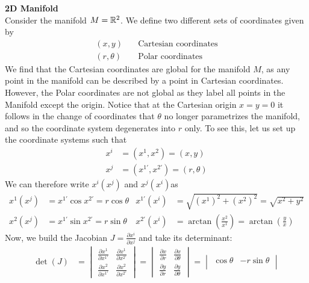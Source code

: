 \documentclass{article}
\begin{document}
 		\begin{exmp}
 			\textbf{2D Manifold}\\
 			Consider the manifold $M=\mathbb{R}^2$. We define two different sets of coordinates given by
 			\begin{align*}
 				(x,y) &\quad \text{Cartesian coordinates} \\
 				(r, \theta) &\quad \text{Polar coordinates}
 			\end{align*}
 			We find that the Cartesian coordinates are global for the manifold $M$, as any point in the manifold can be described by a point in Cartesian coordinates. However, the Polar coordinates are not global as they label all points in the Manifold except the origin. Notice that at the Cartesian origin $x=y=0$ it follows in the change of coordinates that $\theta$ no longer parametrizes the manifold, and so the coordinate system degenerates into $r$ only. To see this, let us set up the coordinate systems such that
 			\begin{align*}
 				x^i &= (x^1, x^2) = (x,y) \\
 				x^j &= (x^{1'}, x^{2'}) = (r, \theta)
 			\end{align*}
 			We can therefore write $x^i(x^j)$ and $x^j (x^i)$as
 			\begin{align*}
 				x^1(x^j) &= x^{1'} \cos x^{2'} = r\cos\theta  & x^{1'}(x^i) &= \sqrt{(x^1)^2 + (x^2)^2} = \sqrt{x^2 + y^2}\\
 				x^2 (x^j) &= x^{1'} \sin x^{2'} = r\sin \theta & x^{2'} (x^i) &= \arctan \left( \frac{x^2}{x^1} \right) = \arctan \left( \frac{y}{x} \right)
 			\end{align*}
 			Now, we build the Jacobian $J = \frac{\partial x^i}{\partial x^j}$ and take its determinant:
 			\begin{align*}
 				\det(J) &= 	\begin{vmatrix}
 					\frac{\partial x^1}{\partial x^{1'}} & \frac{\partial x^1}{\partial x^{2'}} \\
 					\frac{\partial x^2}{\partial x^{1'}} & \frac{\partial x^2}{\partial x^{2'}}
 				\end{vmatrix} =
 				\begin{vmatrix}
 					\frac{\partial x}{\partial r} & \frac{\partial x}{\partial \theta} \\
 					\frac{\partial y}{\partial r} & \frac{\partial y}{\partial \theta}
 				\end{vmatrix} = \begin{vmatrix}
 					\cos \theta & -r \sin \theta \\

\end{vmatrix}
\end{align*}
\end{exmp}
\end{document}
